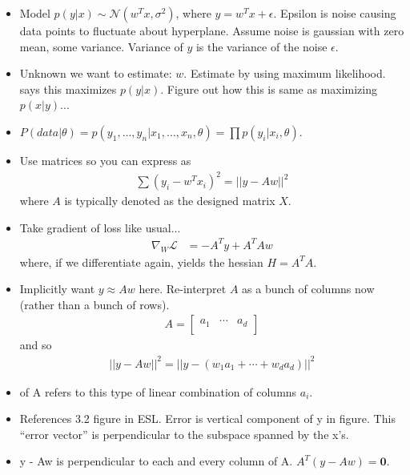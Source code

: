 \documentclass[12pt]{article}
\begin{document}
\begin{itemize}
	\item Model $p(y|x) \sim \mathcal{N}(w^Tx, \sigma^2)$, where $y = w^Tx + \epsilon$. Epsilon is noise causing data points to fluctuate about hyperplane. Assume noise is gaussian with zero mean, some variance. Variance of $y$ is the variance of the noise $\epsilon$. 
	\item Unknown we want to estimate: $w$. Estimate by using maximum likelihood.  says this maximizes $p(y|x)$. Figure out how this is same as maximizing $p(x|y)$...
	\item $P(data|\theta) = p(y_1, \ldots, y_n|x_1, \ldots, x_n, \theta) = \prod p(y_i|x_i, \theta)$. 
	\item Use matrices so you can express as 
	\begin{align}
	\sum (y_i - w^T x_i)^2 = ||y - Aw||^2
	\end{align}
	where $A$ is typically denoted as the designed matrix $X$. 
	\item Take gradient of loss like usual...
	\begin{align}
	\nabla_W \mathcal{L} &= -A^T y + A^T A w
	\end{align}
	where, if we differentiate again, yields the hessian $H = A^T A$. 
	\item Implicitly want $y \approx Aw$ here. Re-interpret $A$ as a bunch of columns now (rather than a bunch of rows). 
	\begin{align}
	A =
	\begin{bmatrix}
	a_1 & \cdots & a_d \\
	\end{bmatrix}
	\end{align}
	and so 
	\begin{align}
	||y - Aw||^2 = ||y -( w_1 a_1 + \cdots + w_d a_d)||^2
	\end{align}
	\item {} of A refers to this type of linear combination of columns $a_i$. 
	\item References 3.2 figure in ESL. Error is vertical component of y in figure. This ``error vector'' is perpendicular to the subspace spanned by the x's. 
	\item y - Aw is perpendicular to each and every column of A. $A^T (y - Aw) = \bm{0}$. 
\end{itemize}
\end{document}
